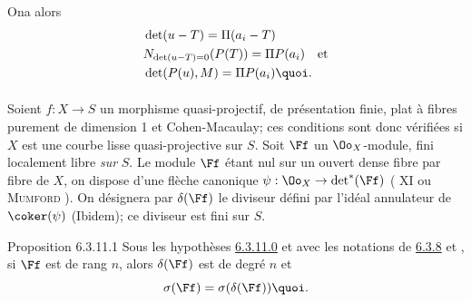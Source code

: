 \documentclass[10pt]{../fichiers-configuration-latex/smfart}
\begin{document}
On\pageoriginale a alors
\begin{align*}
& \det(u-T)=\Pi(a_{i}-T)\\
& N_{\det(u-T)=0}(P(T))=\Pi P(a_{i})\quad\mbox{\rm et}\\
& \det(P(u),M)=\Pi P(a_{i}){\quoi}.
\end{align*}

\setcounter{subsubsection}{11}
\setcounter{paragraph}{-1}
\paragraph{}
Soient $f:X\rightarrow S$ un morphisme quasi-projectif, de
présentation finie, plat à fibres purement de dimension 1 et
Cohen-Macaulay; ces conditions sont donc vérifiées si $X$ est une
courbe lisse quasi-projective sur $S$. Soit $\Ff $ un
$\Oo_{X}$-module, fini localement libre \emph{sur} $S$. Le module
$\Ff $ étant nul sur un ouvert dense fibre par fibre de $X$,
on dispose d'une flèche canonique $\psi:\Oo_{X}\rightarrow
\det^{\ast}(\Ff )$ ( XI ou \textsc{Mumford} ). On
désignera par $\delta(\Ff )$ le diviseur défini par l'idéal
annulateur de $\coker(\psi)$ (Ibidem); ce diviseur est fini sur $S$.

\begin{enonce*}{Proposition 6.3.11.1}
Sous les hypothèses \hyperref[XVII.par6.3.11.0]{6.3.11.0} et avec les notations de
\hyperref[XVII.subsubsec6.3.8]{6.3.8} et , si $\Ff $ est de
rang $n$, alors $\delta(\Ff )$ est de degré $n$ et
\[
\sigma(\Ff )=\sigma(\delta(\Ff )){\quoi}.
\]
\end{enonce*}
\end{document}
